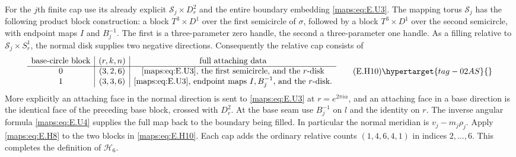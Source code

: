 \begin{theorem}
For the $j$th finite cap use its already explicit
$\mathcal S_j\times D^2_r$ and the entire boundary embedding
\eqref{maps:eq:E.U3}.  The mapping torus $\mathcal S_j$ has the following product
block construction: a block $T^3\times D^1$ over the first
semicircle of $\sigma$, followed by a block $T^3\times D^1$ over
the second semicircle, with endpoint maps $I$ and $B_j^{-1}$.
The first is a three-parameter zero handle, the second a
three-parameter one handle.  As a filling relative to
$\mathcal S_j\times S^1_r$, the normal disk supplies two negative
directions.  Consequently the relative cap consists of
\[
 \begin{array}{c|c|c}
 \hbox{base-circle block}&(r,k,n)&\hbox{full attaching data}\\ \hline
 0&(3,2,6)&\hbox{\eqref{maps:eq:E.U3}, the first semicircle, and the $r$-disk}\\
 1&(3,3,6)&\hbox{\eqref{maps:eq:E.U3}, endpoint maps $I,B_j^{-1}$, and the $r$-disk}.
 \end{array}
 \tag{E.H10}\hypertarget{tag-02AS}{}\label{maps:eq:E.H10}
\]
More explicitly an attaching face in the normal direction is sent
to \eqref{maps:eq:E.U3} at $r=e^{2\pi i\alpha}$, and an attaching face in a
base direction is the identical face of the preceding base block,
crossed with $D^2_r$.  At the base seam use $B_j^{-1}$ on $l$ and
the identity on $r$.  The inverse angular formula \eqref{maps:eq:E.U4} supplies
the full map back to the boundary being filled.  In particular
the normal meridian is $v_j-m_j\rho_j$.
Apply \eqref{maps:eq:E.H8} to the two blocks in \eqref{maps:eq:E.H10}.  Each cap adds the
ordinary relative counts $(1,4,6,4,1)$ in indices $2,\ldots,6$.
This completes the definition of $\mathcal H_6$.


\end{theorem}
